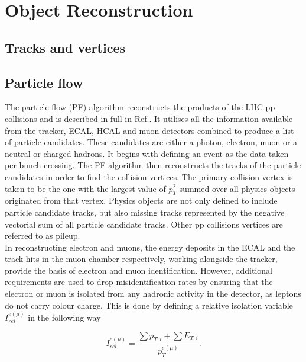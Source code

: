 \chapter{Object Reconstruction}
\label{sec:tau_identification}

\section{Tracks and vertices}

\section{Particle flow}

The particle-flow (PF) algorithm reconstructs the products of the LHC pp collisions and is described in full in Ref.\cite{PF_CMS}.  It utilises all the information available from the tracker, ECAL, HCAL and muon detectors combined to produce a list of particle candidates. These candidates are either a photon, electron, muon or a neutral or charged hadrons. It begins with defining an event as the data taken per bunch crossing. The PF algorithm then reconstructs the tracks of the particle candidates in order to find the collision vertices. The primary collision vertex is taken to be the one with the largest value of \(p_T^{2}\) summed over all physics objects originated from that vertex. Physics objects are not only defined to include particle candidate tracks, but also missing tracks represented by the negative vectorial sum of all particle candidate tracks. Other pp collisions vertices are referred to as pileup. \\

In reconstructing electron and muons, the energy deposits in the ECAL and the track hits in the muon chamber respectively, working alongside the tracker, provide the basis of electron and muon identification. However, additional requirements are used to drop misidentification rates by ensuring that the electron or muon is isolated from any hadronic activity in the detector, as leptons do not carry colour charge. This is done by defining a relative isolation variable \(I_{rel}^{e(\mu)}\) in the following way

\begin{equation}
    I_{rel}^{e(\mu)} = \frac{\sum p_{T,i} + \sum E_{T,i}}{p_T^{e(\mu)}}.
\end{equation}

